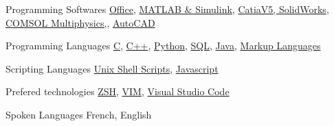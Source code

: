 

\begin{cvskills}

  \cvskill
    {Programming Softwares} %
    {\href{https://www.office.com/}{Office},
     \href{https://www.mathworks.com/}{MATLAB \& Simulink},
     \href{https://www.3ds.com/products-services/}{CatiaV5, SolidWorks},
     \href{https://www.comsol.com/}{COMSOL Multiphysics,},
     \href{https://www.autodesk.ca/en/products/autocad/overview}{AutoCAD}
    } %

  \cvskill
    {Programming Languages} %
    {\href{https://en.cppreference.com/w/c/languagehttps://en.cppreference.com/w/c/language}{C},
     \href{https://en.cppreference.com/w/cpp/language}{C++},
     \href{https://www.python.org/}{Python},
     \href{https://docs.oracle.com/en/database/other-databases/index.html}{SQL},
     \href{https://docs.oracle.com/en/java/index.html}{Java},
     \href{https://techterms.com/definition/markup_language}{Markup Languages}
    } %

  \cvskill
    {Scripting Languages} %
    {\href{https://www.gnu.org/software/bash/}{Unix Shell Scripts},
     \href{https://developer.oracle.com/ca-en/javascript/}{Javascript}
    }

  \cvskill
    {Prefered technologies} %
    {\href{http://zsh.sourceforge.net/}{ZSH},
     \href{https://www.vim.org/}{VIM},
     \href{https://code.visualstudio.com/}{Visual Studio Code}
    } %

  \cvskill
    {Spoken Languages} %
    {French, English} %

\end{cvskills}
